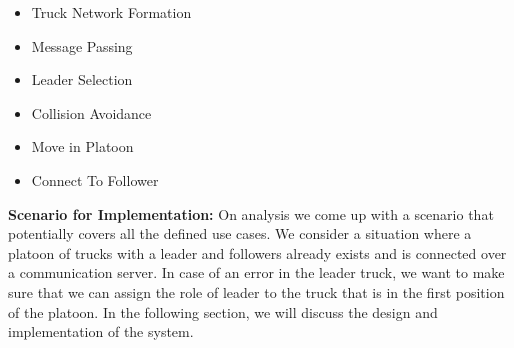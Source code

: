 \begin{itemize}
    \item Truck Network Formation 
    \item Message Passing
    \item Leader Selection 
    \item Collision Avoidance
    \item Move in Platoon 
    \item Connect To Follower
\end{itemize}
\textbf{Scenario for Implementation:} On analysis we come up with a scenario that potentially covers all the defined use cases. We consider a situation where a platoon of trucks with a leader and followers already exists and is connected over a communication server. In case of an error in the leader truck, we want to make sure that we can assign the role of leader to the truck that is in the first position of the platoon.
In the following section, we will discuss the design and implementation of the system.
 
